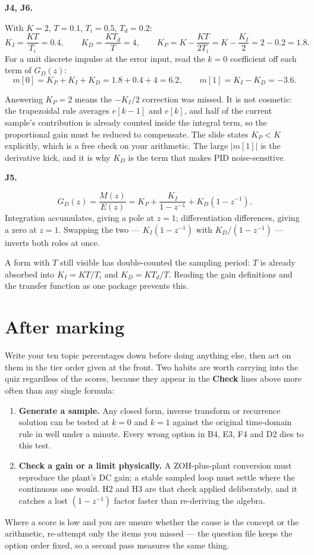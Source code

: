 \documentclass[10pt]{article}
\newcommand{\src}[1]{{\small\color{gray}[PDF pp.~#1]}}
\newcommand{\itemhead}[2]{\par\medskip\noindent\textbf{#1}\quad\src{#2}\par\nopagebreak}
\newcommand{\wrong}[1]{\par\smallskip\noindent{\color{red!55!black}\textbf{If you missed it.}} #1\par}
\begin{document}
\itemhead{J4, J6.}{134--135}
With \(K=2\), \(T=0.1\), \(T_{i}=0.5\), \(T_{d}=0.2\):
\[
K_{I}=\frac{KT}{T_{i}}=0.4,\qquad
K_{D}=\frac{KT_{d}}{T}=4,\qquad
K_{P}=K-\frac{KT}{2T_{i}}=K-\frac{K_{I}}{2}=2-0.2=1.8 .
\]
For a unit discrete impulse at the error input, read the \(k=0\) coefficient off each
term of \(G_{D}(z)\):
\[
m[0]=K_{P}+K_{I}+K_{D}=1.8+0.4+4=6.2,
\qquad
m[1]=K_{I}-K_{D}=-3.6 .
\]
\wrong{Answering \(K_{P}=2\) means the \(-K_{I}/2\) correction was missed. It is not
cosmetic: the trapezoidal rule averages \(e[k-1]\) and \(e[k]\), and half of the
current sample's contribution is already counted inside the integral term, so the
proportional gain must be reduced to compensate. The slide states \(K_{P}<K\)
explicitly, which is a free check on your arithmetic. The large \(|m[1]|\) is the
derivative kick, and it is why \(K_{D}\) is the term that makes PID noise-sensitive.}

\itemhead{J5.}{135}
\[
G_{D}(z)=\frac{M(z)}{E(z)}=K_{P}+\frac{K_{I}}{1-z^{-1}}+K_{D}\left(1-z^{-1}\right).
\]
Integration accumulates, giving a pole at \(z=1\); differentiation differences,
giving a zero at \(z=1\). Swapping the two --- \(K_{I}(1-z^{-1})\) with
\(K_{D}/(1-z^{-1})\) --- inverts both roles at once.
\wrong{A form with \(T\) still visible has double-counted the sampling period:
\(T\) is already absorbed into \(K_{I}=KT/T_{i}\) and \(K_{D}=KT_{d}/T\). Reading the
gain definitions and the transfer function as one package prevents this.}

\section*{After marking}

Write your ten topic percentages down before doing anything else, then act on them
in the tier order given at the front. Two habits are worth carrying into the quiz
regardless of the scores, because they appear in the \textbf{Check} lines above more
often than any single formula:

\begin{enumerate}[label=\arabic*.]
\item \textbf{Generate a sample.} Any closed form, inverse transform or recurrence
solution can be tested at \(k=0\) and \(k=1\) against the original time-domain rule
in well under a minute. Every wrong option in B4, E3, F4 and D2 dies to this test.
\item \textbf{Check a gain or a limit physically.} A ZOH-plus-plant conversion must
reproduce the plant's DC gain; a stable sampled loop must settle where the continuous
one would. H2 and H3 are that check applied deliberately, and it catches a lost
\((1-z^{-1})\) factor faster than re-deriving the algebra.
\end{enumerate}

Where a score is low and you are unsure whether the cause is the concept or the
arithmetic, re-attempt only the items you missed --- the question file keeps the
option order fixed, so a second pass measures the same thing.
\end{document}
